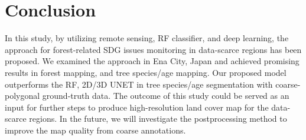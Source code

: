 \section{Conclusion} \label{chap5_conclusion}
In this study, by utilizing remote sensing, RF classifier, and deep learning, the approach for forest-related SDG issues monitoring in data-scarce regions has been proposed. We examined the approach in Ena City, Japan and achieved promising results in forest mapping, and tree species/age mapping. Our proposed model outperforms the RF, 2D/3D UNET in tree species/age segmentation with coarse-polygonal ground-truth data. The outcome of this study could be served as an input for further steps to produce high-resolution land cover map for the data-scarce regions. In the future, we will investigate the postprocessing method to improve the map quality from coarse annotations.